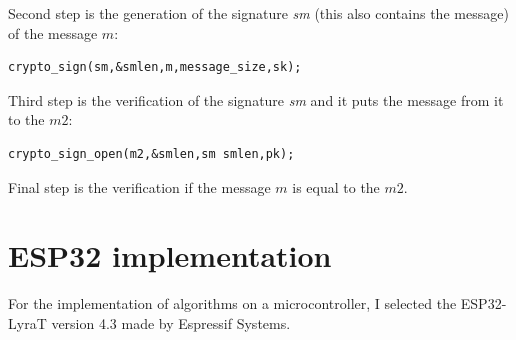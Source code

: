 \documentclass[thesis=M,english]{FITthesis}[2019/12/23]
\begin{document}
\bigskip
\noindent
Second step is the generation of the signature \textit{sm} (this also contains the message) of the message $m$:
\begin{lstlisting}[frame=single]
crypto_sign(sm,&smlen,m,message_size,sk);
\end{lstlisting}

\bigskip
\noindent
Third step is the verification of the signature \textit{sm} and it puts the message from it to the $m2$:
\begin{lstlisting}[frame=single]
crypto_sign_open(m2,&smlen,sm smlen,pk);
\end{lstlisting}

\noindent
Final step is the verification if the message $m$ is equal to the $m2$.

\newpage
\section{ESP32 implementation} \label{ESP32_impl}
For the implementation of algorithms on a microcontroller, I selected the ESP32-LyraT version 4.3 made by Espressif Systems.
\end{document}
